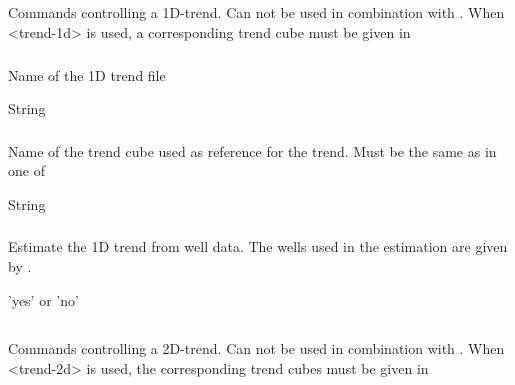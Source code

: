 {\subsection{}
 \slist
   \item \Description Commands controlling a 1D-trend. Can not be used in combination with . When <trend-1d> is used, a corresponding trend cube must be given in 
   \item \Argument
   \item \Default 
 \elist

\subsubsection{}
 \slist
   \item \Description Name of the 1D trend file
   \item \Argument String
   \item \Default 
 \elist

\subsubsection{}
 \slist
   \item \Description Name of the trend cube used as reference for the trend. Must be the same as  in one of 
   \item \Argument String
   \item \Default 
 \elist

\subsubsection{}
 \slist
   \item \Description Estimate the 1D trend from well data. The wells used in the estimation are given by .
   \item \Argument 'yes' or 'no'
   \item \Default 
 \elist

\subsection{}
 \slist
   \item \Description Commands controlling a 2D-trend. Can not be used in combination with .  When <trend-2d> is used, the corresponding trend cubes must be given in 
   \item \Argument
   \item \Default 
 \elist

}
